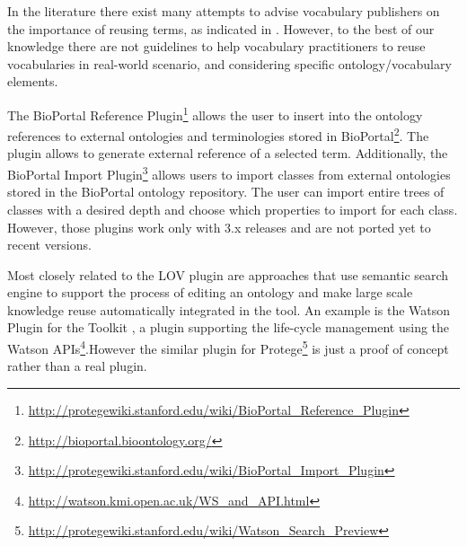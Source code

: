 In the literature there exist many attempts to advise vocabulary publishers on the importance of reusing terms, as indicated in \cite{janowicz2014five,jimenez2008}. However, to the best of our knowledge there are not guidelines to help vocabulary practitioners to reuse vocabularies in real-world scenario, and considering specific ontology/vocabulary elements. 

The BioPortal Reference Plugin\footnote{\url{http://protegewiki.stanford.edu/wiki/BioPortal_Reference_Plugin}} allows the user to insert into the ontology references to external ontologies and terminologies stored in BioPortal\footnote{\url{http://bioportal.bioontology.org/}}. The plugin allows to generate external reference of a selected term. Additionally, the BioPortal Import Plugin\footnote{\url{http://protegewiki.stanford.edu/wiki/BioPortal_Import_Plugin}} allows users to import classes from external ontologies stored in the BioPortal ontology repository. The user can import entire trees of classes with a desired depth and choose which properties to import for each class. However, those plugins work only with \protege 3.x releases and are not ported yet to recent versions. 

Most closely related to the {\protege}LOV plugin are approaches that use semantic search engine to support the process of editing an ontology and make large scale knowledge reuse automatically integrated in the tool. An example is the Watson Plugin \cite{neonguide2008} for the \neon Toolkit \cite{haase2008neon}, a plugin supporting the \neon life-cycle management using the Watson \cite{d2007watson} APIs\footnote{\url{http://watson.kmi.open.ac.uk/WS_and_API.html}}.However the similar plugin for Protege\footnote{\url{http://protegewiki.stanford.edu/wiki/Watson_Search_Preview}} is just a proof of concept rather than a real plugin.

 
